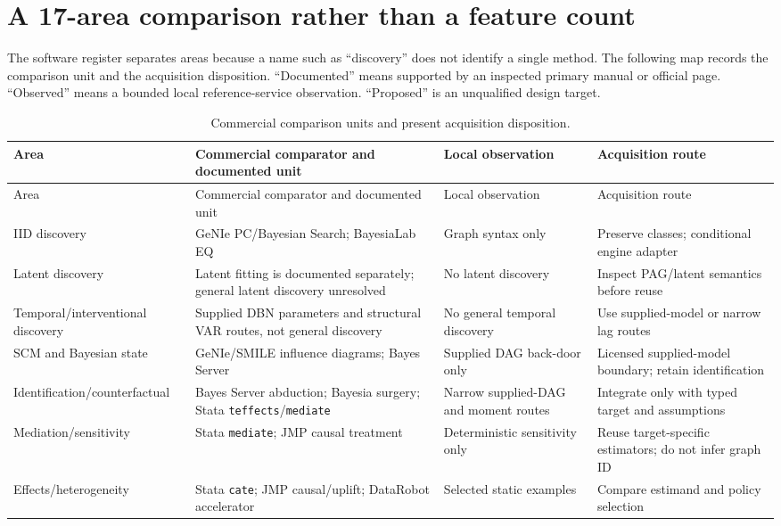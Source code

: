 \section{A 17-area comparison rather than a feature count}
\label{exec17:s8-map}

The software register separates areas because a name such as ``discovery''
does not identify a single method. The following map records the comparison
unit and the acquisition disposition. ``Documented'' means supported by an
inspected primary manual or official page. ``Observed'' means a bounded local
reference-service observation. ``Proposed'' is an unqualified design target.

\begingroup\small
\begin{longtable}{@{}P{.18\linewidth}P{.29\linewidth}P{.21\linewidth}P{.23\linewidth}@{}}
\caption{Commercial comparison units and present acquisition disposition.}
\label{exec17:s8-coverage-table}\\
\toprule
Area & Commercial comparator and documented unit & Local observation & Acquisition route \\
\midrule
\endfirsthead
\toprule
Area & Commercial comparator and documented unit & Local observation & Acquisition route \\
\midrule
\endhead
IID discovery & GeNIe PC/Bayesian Search; BayesiaLab EQ & Graph syntax only & Preserve classes; conditional engine adapter \\
Latent discovery & Latent fitting is documented separately; general latent discovery unresolved & No latent discovery & Inspect PAG/latent semantics before reuse \\
Temporal/interventional discovery & Supplied DBN parameters and structural VAR routes, not general discovery & No general temporal discovery & Use supplied-model or narrow lag routes \\
SCM and Bayesian state & GeNIe/SMILE influence diagrams; Bayes Server & Supplied DAG back-door only & Licensed supplied-model boundary; retain identification \\
Identification/counterfactual & Bayes Server abduction; Bayesia surgery; Stata \texttt{teffects}/\texttt{mediate} & Narrow supplied-DAG and moment routes & Integrate only with typed target and assumptions \\
Mediation/sensitivity & Stata \texttt{mediate}; JMP causal treatment & Deterministic sensitivity only & Reuse target-specific estimators; do not infer graph ID \\
Effects/heterogeneity & Stata \texttt{cate}; JMP causal/uplift; DataRobot accelerator & Selected static examples & Compare estimand and policy selection \\

\end{longtable}

